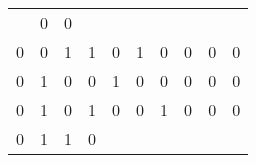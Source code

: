 \begin{tabular}{|c|c|c|c||c|c|c|c|c|c|}
    & 0
  
    
    
    & 0
   \\
  

  
  
  0 & 0 & 1 & 1
  
    
    
    & 0
  
    
    
    & 1
  
    
    
    & 0
  
    
    
    & 0
  
    
    
    & 0
  
    
    
    & 0
   \\
  \hline

  
  
  0 & 1 & 0 & 0
  
    
    
    & 1
  
    
    
    & 0
  
    
    
    & 0
  
    
    
    & 0
  
    
    
    & 0
  
    
    
    & 0
   \\
  

  
  
  0 & 1 & 0 & 1
  
    
    
    & 0
  
    
    
    & 0
  
    
    
    & 1
  
    
    
    & 0
  
    
    
    & 0
  
    
    
    & 0
   \\
  

  
  
  0 & 1 & 1 & 0
  
    
    

\end{tabular}
